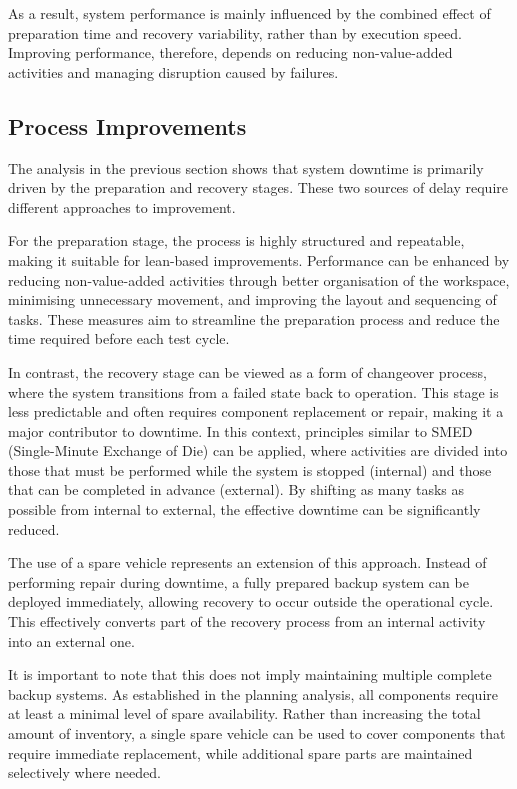 As a result, system performance is mainly influenced by the combined effect of preparation time and recovery variability, rather than by execution speed. Improving performance, therefore, depends on reducing non-value-added activities and managing disruption caused by failures.

\subsection{Process Improvements}

The analysis in the previous section shows that system downtime is primarily driven by the preparation and recovery stages. These two sources of delay require different approaches to improvement.

For the preparation stage, the process is highly structured and repeatable, making it suitable for lean-based improvements. Performance can be enhanced by reducing non-value-added activities through better organisation of the workspace, minimising unnecessary movement, and improving the layout and sequencing of tasks. These measures aim to streamline the preparation process and reduce the time required before each test cycle.

In contrast, the recovery stage can be viewed as a form of changeover process, where the system transitions from a failed state back to operation. This stage is less predictable and often requires component replacement or repair, making it a major contributor to downtime. In this context, principles similar to SMED (Single-Minute Exchange of Die) can be applied, where activities are divided into those that must be performed while the system is stopped (internal) and those that can be completed in advance (external). By shifting as many tasks as possible from internal to external, the effective downtime can be significantly reduced.

The use of a spare vehicle represents an extension of this approach. Instead of performing repair during downtime, a fully prepared backup system can be deployed immediately, allowing recovery to occur outside the operational cycle. This effectively converts part of the recovery process from an internal activity into an external one.

It is important to note that this does not imply maintaining multiple complete backup systems. As established in the planning analysis, all components require at least a minimal level of spare availability. Rather than increasing the total amount of inventory, a single spare vehicle can be used to cover components that require immediate replacement, while additional spare parts are maintained selectively where needed.

